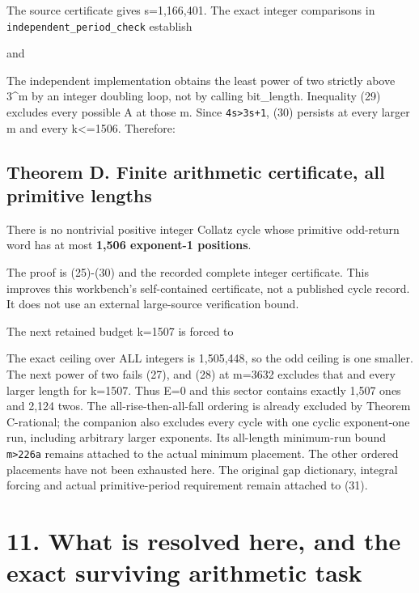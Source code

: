 The source certificate gives s=1,166,401. The exact integer comparisons
in \nolinkurl{independent_period_check} establish


and


The independent implementation obtains the least power of two strictly
above 3\^{}m by an integer doubling loop, not by calling bit\_length.
Inequality (29) excludes every possible A at those m. Since
\nolinkurl{4s>3s+1}, (30) persists at every larger m and every
k\textless=1506. Therefore:

\subsection{Theorem D. Finite arithmetic certificate, all primitive
lengths}

There is no nontrivial positive integer Collatz cycle whose primitive
odd-return word has at most \textbf{1,506 exponent-1 positions}.

The proof is (25)-(30) and the recorded complete integer certificate.
This improves this workbench's self-contained certificate, not a
published cycle record. It does not use an external large-source
verification bound.

The next retained budget k=1507 is forced to


The exact ceiling over ALL integers is 1,505,448, so the odd ceiling is
one smaller. The next power of two fails (27), and (28) at m=3632
excludes that and every larger length for k=1507. Thus E=0 and this
sector contains exactly 1,507 ones and 2,124 twos. The
all-rise-then-all-fall ordering is already excluded by Theorem
C-rational; the companion also excludes every cycle with one cyclic
exponent-one run, including arbitrary larger exponents. Its all-length
minimum-run bound \nolinkurl{m>226a} remains attached to the actual
minimum placement. The other ordered placements have not been exhausted
here. The original gap dictionary, integral forcing and actual
primitive-period requirement remain attached to (31).

\section{11. What is resolved here, and the exact surviving arithmetic
task}

